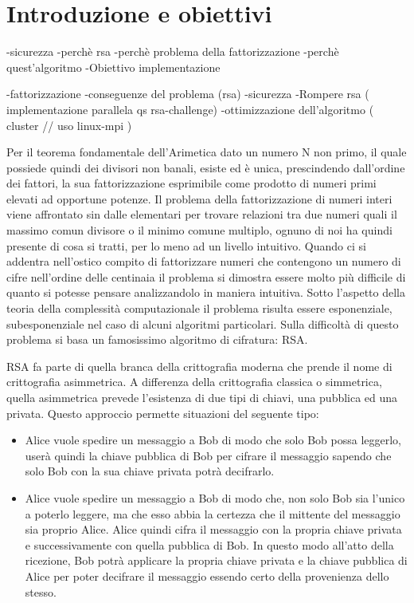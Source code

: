 \section{Introduzione e obiettivi}
\label{sec:introduzione}

-sicurezza
-perchè rsa
-perchè problema della fattorizzazione
-perchè quest'algoritmo
-Obiettivo implementazione


-fattorizzazione
-conseguenze del problema (rsa)
-sicurezza
-Rompere rsa ( implementazione parallela qs rsa-challenge)
-ottimizzazione dell'algoritmo
		( cluster // uso linux-mpi )


Per il teorema fondamentale dell'Arimetica dato un numero N non primo, il quale possiede quindi dei divisori non banali, esiste ed è unica, prescindendo dall'ordine dei fattori, la sua fattorizzazione esprimibile come prodotto di numeri primi elevati ad opportune potenze.
Il problema della fattorizzazione di numeri interi viene affrontato sin dalle elementari per trovare relazioni tra due numeri quali il massimo comun divisore o il minimo comune multiplo, ognuno di noi ha quindi presente di cosa si tratti, per lo meno ad un livello intuitivo.
Quando ci si addentra nell'ostico compito di fattorizzare numeri che contengono un numero di cifre nell'ordine delle centinaia il problema si dimostra essere molto più difficile di quanto si potesse pensare analizzandolo in maniera intuitiva.
Sotto l'aspetto della teoria della complessità computazionale il problema risulta essere esponenziale, subesponenziale nel caso di alcuni algoritmi particolari.
Sulla difficoltà di questo problema si basa un famosissimo algoritmo di cifratura: RSA.

RSA fa parte di quella branca della crittografia moderna che prende il nome di crittografia asimmetrica.
A differenza della crittografia classica o simmetrica, quella asimmetrica prevede l'esistenza di due tipi di chiavi, una pubblica ed una privata.
Questo approccio permette situazioni del seguente tipo:
\begin{itemize}


\item Alice vuole spedire un messaggio a Bob di modo che solo Bob possa leggerlo, userà quindi la chiave pubblica di Bob per cifrare il messaggio sapendo che solo Bob con la sua chiave privata potrà decifrarlo.

\item Alice vuole spedire un messaggio a Bob di modo che, non solo Bob sia l'unico a poterlo leggere, ma che esso abbia la certezza che il mittente del messaggio sia proprio Alice.
Alice quindi cifra il messaggio con la propria chiave privata e successivamente con quella pubblica di Bob. In questo modo all'atto della ricezione, Bob potrà applicare la propria chiave privata e la chiave pubblica di Alice per poter decifrare il messaggio essendo certo della provenienza dello stesso.

\end{itemize}

